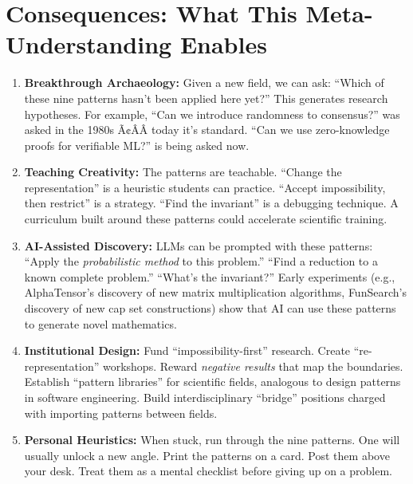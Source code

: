 \section{Consequences: What This Meta-Understanding Enables}
\label{sec:anatomy:consequences}

\begin{enumerate}
\item \textbf{Breakthrough Archaeology:} Given a new field, we can ask: ``Which of these nine patterns hasn't been applied here yet?'' This generates research hypotheses. For example, ``Can we introduce randomness to consensus?'' was asked in the 1980s Ã¢ÂÂ today it's standard. ``Can we use zero-knowledge proofs for verifiable ML?'' is being asked now.

\item \textbf{Teaching Creativity:} The patterns are teachable. ``Change the representation'' is a heuristic students can practice. ``Accept impossibility, then restrict'' is a strategy. ``Find the invariant'' is a debugging technique. A curriculum built around these patterns could accelerate scientific training.

\item \textbf{AI-Assisted Discovery:} LLMs can be prompted with these patterns: ``Apply the \emph{probabilistic method} to this problem.'' ``Find a reduction to a known complete problem.'' ``What's the invariant?'' Early experiments (e.g., AlphaTensor's discovery of new matrix multiplication algorithms, FunSearch's discovery of new cap set constructions) show that AI can use these patterns to generate novel mathematics.

\item \textbf{Institutional Design:} Fund ``impossibility-first'' research. Create ``re-representation'' workshops. Reward \emph{negative results} that map the boundaries. Establish ``pattern libraries'' for scientific fields, analogous to design patterns in software engineering. Build interdisciplinary ``bridge'' positions charged with importing patterns between fields.

\item \textbf{Personal Heuristics:} When stuck, run through the nine patterns. One will usually unlock a new angle. Print the patterns on a card. Post them above your desk. Treat them as a mental checklist before giving up on a problem.


\end{enumerate}
